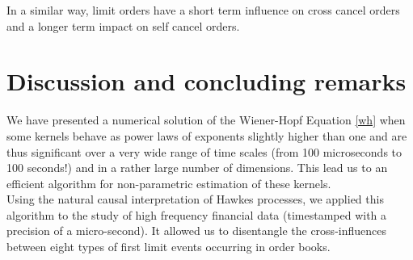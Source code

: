 \documentclass[a4paper,11pt]{article}
\begin{document}
\noindent In a similar way, limit orders have a short term influence on cross cancel orders and a longer term impact on self cancel orders.


\section{Discussion and concluding remarks}
\label{conc}


We have presented a numerical solution of the Wiener-Hopf Equation \eqref{wh} when some kernels behave as power laws of exponents slightly higher than one and are thus significant over a very wide range of time scales (from 100 microseconds to 100 seconds!) and in a rather large number of dimensions. This lead us to an efficient algorithm for non-parametric estimation of these kernels.\\


\noindent Using the natural causal interpretation of Hawkes processes, we applied this algorithm to the study of
high frequency financial data (timestamped with  a precision of a micro-second). It allowed us to disentangle the cross-influences between eight types of first limit events occurring in order books.\\
\end{document}
